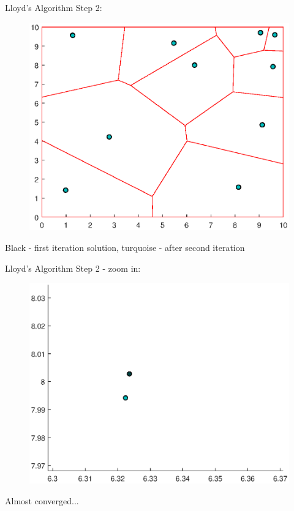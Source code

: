 \documentclass[t]{beamer}
\begin{document}
\begin{frame}[label=lloydsalg3]{Lloyd's Algorithm}
Step 2:
\begin{figure}
\centering
\includegraphics[scale=0.4]{background/cvt-calc-step2.eps}
\end{figure}
Black - first iteration solution, turquoise - after second iteration
\end{frame}
\begin{frame}[label=lloydsalg4]{Lloyd's Algorithm}
Step 2 - zoom in:
\begin{figure}
\centering
\includegraphics[scale=0.4]{background/cvt-calc-step2-zoom.eps}
\end{figure}
Almost converged...
\end{frame}
\end{document}

